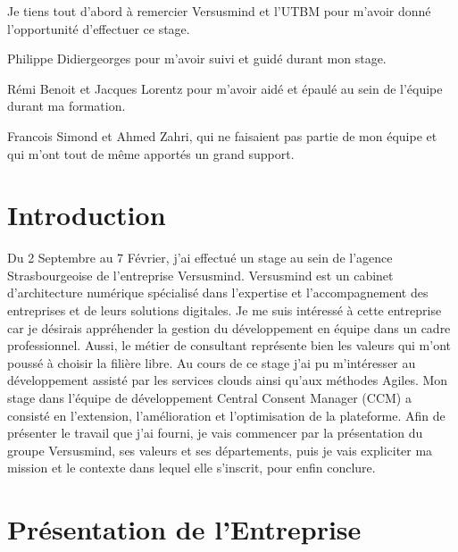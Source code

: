 \documentclass[12pt, a4paper]{report}
\begin{document}
\makeutbmfrontcover{}
Je tiens tout d'abord à remercier Versusmind et l'UTBM pour m'avoir donné l'opportunité d'effectuer ce stage.\newline

Philippe Didiergeorges pour m'avoir suivi et guidé durant mon stage.\newline

Rémi Benoit et Jacques Lorentz pour m'avoir aidé et épaulé au sein de l'équipe durant ma formation.\newline

Francois Simond et Ahmed Zahri, qui ne faisaient pas partie de mon équipe et qui m'ont tout de même apportés un grand support.
\newpage
\tableofcontents
\chapter{Introduction}
Du 2 Septembre au 7 Février, j'ai effectué un stage au sein de l'agence Strasbourgeoise de l'entreprise Versusmind.\newline
Versusmind est un cabinet d'architecture numérique spécialisé dans l'expertise et l'accompagnement des entreprises et de leurs solutions digitales.\newline
Je me suis intéressé à cette entreprise car je désirais appréhender la gestion du développement en équipe dans un cadre professionnel.
Aussi, le métier de consultant représente bien les valeurs qui m'ont poussé à choisir la filière libre.\newline
Au cours de ce stage j'ai pu m'intéresser au développement assisté par les services clouds ainsi qu'aux méthodes Agiles.\newline
Mon stage dans l'équipe de développement Central Consent Manager (CCM) a consisté en l'extension, l'amélioration et l'optimisation de la plateforme.\newline
Afin de présenter le travail que j'ai fourni, je vais commencer par la présentation du groupe Versusmind, ses valeurs et ses départements, puis je vais expliciter ma mission et le contexte dans lequel elle s'inscrit, pour enfin conclure.
\chapter{Présentation de l’Entreprise}
\end{document}

